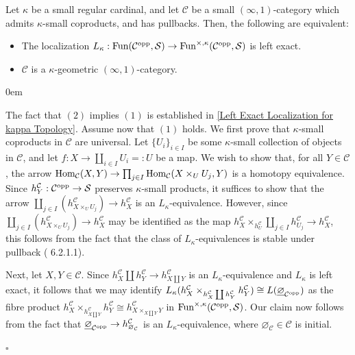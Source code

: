 \documentclass[10pt]{article}
\newcommand{\mS}{\mathcal S}
\newcommand{\C}{\mathcal C}
\renewcommand{\qed}{\hfill$\square$}
\renewenvironment{proof}{\begin{addmargin}[1em]{0em}\begin{newproof}}{\end{newproof}\end{addmargin}\qed}
\theoremstyle{witharg}
\theoremstyle{witharg}
\theoremstyle{witharg2}
\begin{document}
\begin{proposition}{}\label{Converse to Left Exact Localization for kappa Topology}

    Let $\kappa$ be a small regular cardinal, and let $\C$ be a small $(\infty,1)$-category which admits $\kappa$-small coproducts, and has pullbacks. Then, the following are equivalent:

    \begin{itemize}
        \item [$(1)$] The localization $L_\kappa:\textnormal{Fun}(\C^{\textnormal{opp}},\mS)\rightarrow \textnormal{Fun}^{\times,\kappa}(\C^{\textnormal{opp}},\mS)$ is left exact. 

        \item [$(2)$] $\C$ is a $\kappa$-geometric $(\infty,1)$-category. 
        
    \end{itemize}

\end{proposition}

\begin{proof}

    The fact that $(2)$ implies $(1)$ is established in \ref{Left Exact Localization for kappa Topology}. Assume now that $(1)$ holds. We first prove that $\kappa$-small coproducts in $\C$ are universal. Let $\{U_i\}_{i\in I}$ be some $\kappa$-small collection of objects in $\C$, and let $f:X\rightarrow \coprod_{i\in I}U_i=:U$ be a map. We wish to show that, for all $Y\in \C$, the arrow $\textnormal{Hom}_\C(X,Y)\rightarrow \prod_{j\in I}\textnormal{Hom}_\C(X\times_{U} U_j,Y)$ is a homotopy equivalence. Since $h^\C_Y:\C^{\textnormal{opp}}\rightarrow \mS$ preserves $\kappa$-small products, it suffices to show that the arrow $\coprod_{j\in I}(h^\C_{X\times_{U} U_j})\rightarrow h^\C_X$ is an $L_\kappa$-equivalence. However, since $\coprod_{j\in I}(h^\C_{X\times_{U} U_j})\rightarrow h^\C_X$ may be identified as the map $h^\C_{X}\times_{h^\C_{U}}\coprod_{j\in I}h^\C_{U_j}\rightarrow h^\C_{X}$, this follows from the fact that the class of $L_\kappa$-equivalences is stable under pullback ( 6.2.1.1).

    Next, let $X,Y\in \C$. Since $h^\C_X\coprod h^\C_Y\rightarrow h^\C_{X\coprod Y}$ is an $L_\kappa$-equivalence and $L_\kappa$ is left exact, it follows that we may identify $L_\kappa(h^\C_X\times_{h^\C_X\coprod h^\C_Y}h^\C_Y)\cong L(\underline{\varnothing}_{\C^{\textnormal{opp}}})$ as the fibre product $h^\C_X\times_{h^\C_{X\coprod Y}}h^\C_Y\cong h^\C_{X\times_{X\coprod Y}Y}$ in $\textnormal{Fun}^{\times,\kappa}(\C^{\textnormal{opp}},\mS)$. Our claim now follows from the fact that $\underline{\varnothing}_{\C^{\textnormal{opp}}}\rightarrow h^\C_{\varnothing_\C}$ is an $L_\kappa$-equivalence, where $\varnothing_\C\in \C$ is initial. 

\end{proof}
\end{document}
